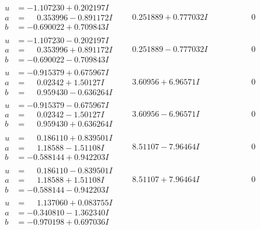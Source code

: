 \documentclass[1p]{elsarticle_modified}
\theoremstyle{definition}
\begin{document}
$$\begin{array}{c|c|c}
\begin{aligned}
u &= -1.107230 + 0.202197 I \\
a &= \phantom{-}0.353996 - 0.891172 I \\
b &= -0.690022 + 0.709843 I\end{aligned}
 & \phantom{-}0.251889 + 0.777032 I & \phantom{-0.000000 } 0 \\ \hline\begin{aligned}
u &= -1.107230 - 0.202197 I \\
a &= \phantom{-}0.353996 + 0.891172 I \\
b &= -0.690022 - 0.709843 I\end{aligned}
 & \phantom{-}0.251889 - 0.777032 I & \phantom{-0.000000 } 0 \\ \hline\begin{aligned}
u &= -0.915379 + 0.675967 I \\
a &= \phantom{-}0.02342 + 1.50127 I \\
b &= \phantom{-}0.959430 - 0.636264 I\end{aligned}
 & \phantom{-}3.60956 + 6.96571 I & \phantom{-0.000000 } 0 \\ \hline\begin{aligned}
u &= -0.915379 - 0.675967 I \\
a &= \phantom{-}0.02342 - 1.50127 I \\
b &= \phantom{-}0.959430 + 0.636264 I\end{aligned}
 & \phantom{-}3.60956 - 6.96571 I & \phantom{-0.000000 } 0 \\ \hline\begin{aligned}
u &= \phantom{-}0.186110 + 0.839501 I \\
a &= \phantom{-}1.18588 - 1.51108 I \\
b &= -0.588144 + 0.942203 I\end{aligned}
 & \phantom{-}8.51107 - 7.96464 I & \phantom{-0.000000 } 0 \\ \hline\begin{aligned}
u &= \phantom{-}0.186110 - 0.839501 I \\
a &= \phantom{-}1.18588 + 1.51108 I \\
b &= -0.588144 - 0.942203 I\end{aligned}
 & \phantom{-}8.51107 + 7.96464 I & \phantom{-0.000000 } 0 \\ \hline\begin{aligned}
u &= \phantom{-}1.137060 + 0.083755 I \\
a &= -0.340810 - 1.362340 I \\
b &= -0.970198 + 0.697036 I\end{aligned}

\end{array}$$
\end{document}
